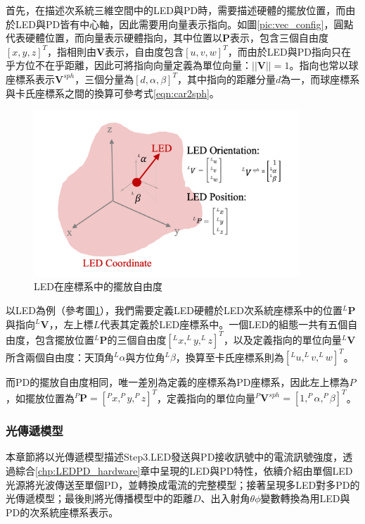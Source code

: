         首先，在描述次系統三維空間中的LED與PD時，需要描述硬體的擺放位置，而由於LED與PD皆有中心軸，因此需要用向量表示指向。如圖\ref{pic:vec_config}，圓點代表硬體位置，而向量表示硬體指向，其中位置以$\boldsymbol{P}$表示，包含三個自由度$[x,y,z]^T$，指相則由$\boldsymbol{V}$表示，自由度包含$[u,v,w]^T$，而由於LED與PD指向只在乎方位不在乎距離，因此可將指向向量定義為單位向量：$||\boldsymbol{V}||=1$。指向也常以球座標系表示$\boldsymbol{V}^{sph}$，三個分量為$[d,\alpha,\beta]^T$，其中指向的距離分量$d$為一，而球座標系與卡氏座標系之間的換算可參考式\ref{eqn:car2sph}。
        

        \begin{figure}[htpb]
            \centering
            \includegraphics[width=10cm]{ch2pic/LED_config.png}
            \caption{LED在座標系中的擺放自由度}
            \label{pic:led_config}
        \end{figure}

        以LED為例（參考圖\ref{pic:led_config}），我們需要定義LED硬體於LED次系統座標系中的位置$^{L}\boldsymbol{P}$與指向$^{L}\boldsymbol{V}$，，左上標$L$代表其定義於LED座標系中。一個LED的組態一共有五個自由度，包含擺放位置$^L \boldsymbol{P}$的三個自由度$[^Lx,^Ly,^Lz]^T$，以及定義指向的單位向量$^L\boldsymbol{V}$所含兩個自由度：天頂角$^L\alpha$與方位角$^L\beta$，換算至卡氏座標系則為$[^Lu,^Lv,^Lw]^T$。

        而PD的擺放自由度相同，唯一差別為定義的座標系為PD座標系，因此左上標為$P$，如擺放位置為$^P \boldsymbol{P}=[^Px,^Py,^Pz]^T$，定義指向的單位向量$^P\boldsymbol{V}^{sph}=[1,^P\alpha,^P\beta]^T$。

    \subsubsection{光傳遞模型}
    \label{chp:model}


    本章節將以光傳遞模型描述Step3.LED發送與PD接收訊號中的電流訊號強度，透過綜合\ref{chp:LEDPD_hardware}章中呈現的LED與PD特性，依續介紹由單個LED光源將光波傳送至單個PD，並轉換成電流的完整模型；接著呈現多LED對多PD的光傳遞模型；最後則將光傳播模型中的距離$D$、出入射角$\theta\phi$變數轉換為用LED與PD的次系統座標系表示。
            
